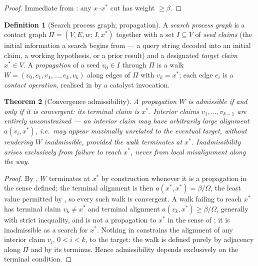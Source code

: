 \documentclass[11pt,twocolumn,a4paper]{article}
\theoremstyle{thmstyle}
\newtheorem{theorem}{Theorem}[section]
\theoremstyle{definition}
\newtheorem{definition}[theorem]{Definition}
\theoremstyle{remark}
\newcommand{\V}{V}
\newcommand{\E}{E}
\newcommand{\wt}{w}
\newcommand{\flo}{\beta}
\newcommand{\Walk}{W}
\newcommand{\Proc}{\Pi}
\begin{document}
\begin{proof}
Immediate from : any $x$--$x^{\ast}$ cut has weight
$\ge\flo$.
\end{proof}

\begin{definition}[Search process graph; propagation]
\label{def:process}
A \emph{search process graph} is a contact graph
$\Proc=(\V,\E,\wt;\,I,x^{\ast})$ together with a set $I\subseteq\V$ of
\emph{seed claims} (the initial information a search begins from --- a
query string decoded into an initial claim, a working hypothesis, or a
prior result) and a designated \emph{target claim} $x^{\ast}\in\V$. A
\emph{propagation} of a seed $v_0\in I$ through $\Proc$ is a walk
$\Walk=(v_0,e_1,v_1,\dots,e_k,v_k)$ along edges of $\Proc$ with
$v_k=x^{\ast}$; each edge $e_i$ is a \emph{contact operation}, realised in
 by a catalyst invocation.
\end{definition}

\begin{theorem}[Convergence admissibility]
\label{thm:admissibility}
A propagation $\Walk$ is \emph{admissible} if and only if it is
\emph{convergent}: its terminal claim is $x^{\ast}$. Interior claims
$v_1,\dots,v_{k-1}$ are entirely unconstrained --- an interior claim may
have arbitrarily large alignment $a(v_i,x^{\ast})$, i.e.\ may appear
maximally unrelated to the eventual target, without rendering $\Walk$
inadmissible, provided the walk terminates at $x^{\ast}$. Inadmissibility
arises exclusively from failure to reach $x^{\ast}$, never from local
misalignment along the way.
\end{theorem}

\begin{proof}
By , $\Walk$ terminates at $x^{\ast}$ by construction
whenever it is a propagation in the sense defined; the terminal alignment
is then $a(x^{\ast},x^{\ast})=\flo/\Omega$, the least value permitted by
, so every such walk is convergent. A walk failing to
reach $x^{\ast}$ has terminal claim $v_k\neq x^{\ast}$ and terminal
alignment $a(v_k,x^{\ast})\ge\flo/\Omega$, generally with strict
inequality, and is not a propagation to $x^{\ast}$ in the sense of
; it is inadmissible as a search for $x^{\ast}$.
Nothing in  constrains the alignment of any interior
claim $v_i$, $0<i<k$, to the target: the walk is defined purely by
adjacency along $\Proc$ and by its terminus. Hence admissibility depends
exclusively on the terminal condition.
\end{proof}
\end{document}
